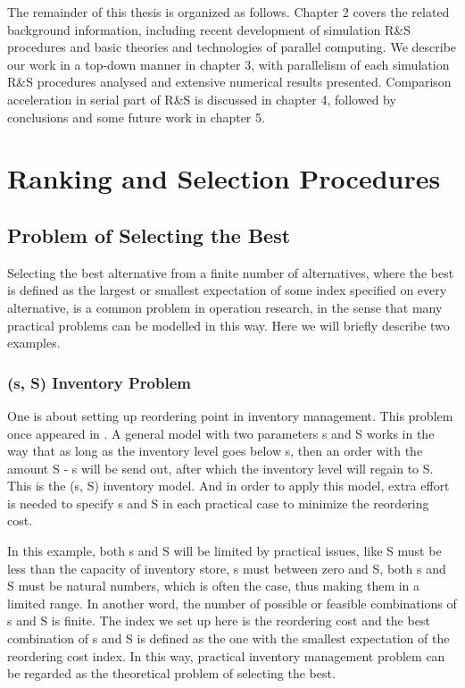 \documentclass[12pt,a4paper]{report}
\begin{document}
The remainder of this thesis is organized as follows. Chapter 2 covers the related background information, including recent development of simulation R\&S procedures and basic theories and technologies of parallel computing. We describe our work in a top-down manner in chapter 3, with parallelism of each simulation R\&S procedures analysed and extensive numerical results presented. Comparison acceleration in serial part of R\&S is discussed in chapter 4, followed by conclusions and some future work in chapter 5.

\chapter{Ranking and Selection Procedures}

\section{Problem of Selecting the Best}

Selecting the best alternative from a finite number of alternatives, where the best is defined as the largest or smallest expectation of some index specified on every alternative, is a common problem in operation research, in the sense that many practical problems can be modelled in this way. Here we will briefly describe two examples.

\subsection{(s, S) Inventory Problem}

One is about setting up reordering point in inventory management. This problem once appeared in \cite{cissac1985ss}. A general model with two parameters s and S works in the way that as long as the inventory level goes below s, then an order with the amount S - s will be send out, after which the inventory level will regain to S. This is the (s, S) inventory model. And in order to apply this model, extra effort is needed to specify s and S in each practical case to minimize the reordering cost.

In this example, both s and S will be limited by practical issues, like S must be less than the capacity of inventory store, s must between zero and S, both s and S must be natural numbers, which is   often the case, thus making them in a limited range. In another word, the number of possible or feasible combinations of s and S is finite. The index we set up here is the reordering cost and the best combination of s and S is defined as the one with the smallest expectation of the reordering cost index. In this way, practical inventory management problem can be regarded as the theoretical problem of selecting the best.
\end{document}
